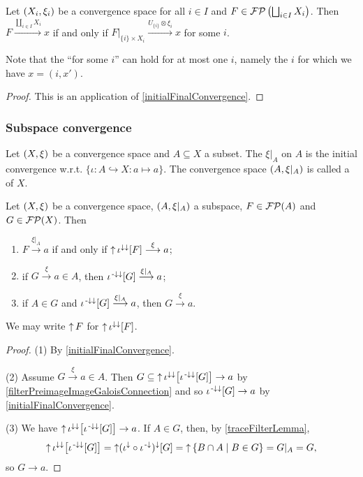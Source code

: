 \begin{proposition}
Let $\left( X_i, \xi_i \right)$ be a convergence space for all $i\in I$ and $F\in\operatorname{\mathcal{FP}}\left(\bigsqcup_{i\in I}X_i\right)$. Then $F\overset{\coprod_{i\in I}X_i}{\longrightarrow} x$ \textup{if and only if} $F|_{\{i\}\times X_i} \overset{U_{\{i\}}\otimes \xi_i}{\longrightarrow} x$ for some $i$.
\end{proposition}
Note that the ``for some $i$'' can hold for at most one $i$, namely the $i$ for which we have $x = (i, x')$.
\begin{proof}
This is an application of \ref{initialFinalConvergence}.
\end{proof}


\subsubsection{Subspace convergence}
\begin{definition}
Let $\left( X,\xi \right)$ be a convergence space and $A\subseteq X$ a subset. The  $\xi|_A$ on $A$ is the initial convergence w.r.t. $\{\iota: A \hookrightarrow X: a\mapsto a\}$. The convergence space $\left( A,\xi|_A \right)$ is called a  of $X$.
\end{definition}

\begin{lemma} \label{subspaceConvergence}
Let $\left( X,\xi \right)$ be a convergence space, $\left( A,\xi|_A \right)$ a subspace, $F\in \operatorname{\mathcal{FP}}(A)$ and $G\in \operatorname{\mathcal{FP}}(X)$. Then
\begin{enumerate}
\item $F \overset{\xi|_A}{\longrightarrow} a$ if and only if $\operatorname{\uparrow} \iota^{\downarrow\downarrow}[F] \overset{\xi}{\longrightarrow} a$;
\item if $G\overset{\xi}{\longrightarrow} a \in A$, then $\iota^{{\text{\hspace{0.15em}-}\downarrow}\downarrow}[G]\overset{\xi|_A}{\longrightarrow} a$;
\item if $A\in G$ and $\iota^{{\text{\hspace{0.15em}-}\downarrow}\downarrow}[G]\overset{\xi|_A}{\longrightarrow} a$, then $G\overset{\xi}{\longrightarrow} a$.
\end{enumerate}
\end{lemma}
We may write $\operatorname{\uparrow} F$ for $\operatorname{\uparrow} \iota^{\downarrow\downarrow}[F]$.
\begin{proof}
(1) By \ref{initialFinalConvergence}.

(2) Assume $G\overset{\xi}{\longrightarrow} a \in A$. Then $G \subseteq \operatorname{\uparrow}\iota^{\downarrow\downarrow}\big[\iota^{{\text{\hspace{0.15em}-}\downarrow}\downarrow}[G]\big] \to a$ by \ref{filterPreimageImageGaloisConnection} and so $\iota^{{\text{\hspace{0.15em}-}\downarrow}\downarrow}[G] \to a$ by \ref{initialFinalConvergence}.

(3) We have $\operatorname{\uparrow}\iota^{\downarrow\downarrow}\big[\iota^{{\text{\hspace{0.15em}-}\downarrow}\downarrow}[G]\big] \to a$. If $A\in G$, then, by \ref{traceFilterLemma},
\[ \operatorname{\uparrow}\iota^{\downarrow\downarrow}\big[\iota^{{\text{\hspace{0.15em}-}\downarrow}\downarrow}[G]\big] = \operatorname{\uparrow}( \iota^{\downarrow}\circ \iota^{{\text{\hspace{0.15em}-}\downarrow}})^\downarrow[G] = \operatorname{\uparrow} \left\{ B\cap A \;\middle|\; B\in G \right\} = G|_A = G, \]
so $G\to a$.
\end{proof}


